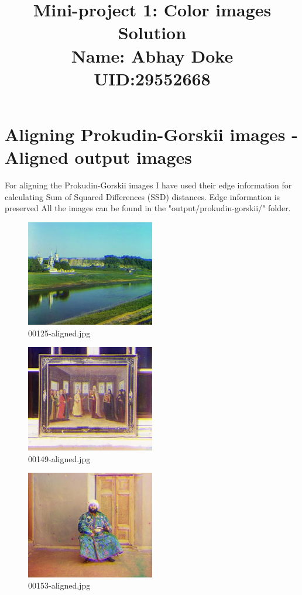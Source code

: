 \documentclass[10pt,letterpaper]{article}
\title{
  \textbf{Mini-project 1: Color images Solution} \\
  \textbf{Name: Abhay Doke}\\
  \textbf{UID:29552668}
}
\date{}
\begin{document}
\maketitle

\section{Aligning Prokudin-Gorskii images - Aligned output images} 
For aligning the Prokudin-Gorskii images I have used their edge information for calculating Sum of Squared Differences (SSD) distances.
Edge information is preserved  
All the images can be found in the "output/prokudin-gorskii/" folder.

\begin{figure}[h]
\centering
\includegraphics[width=0.5\textwidth]{output/prokudin-gorskii/00125-aligned.jpg}
\caption{00125-aligned.jpg}
\end{figure}

\begin{figure}[h]
\centering
\includegraphics[width=0.5\textwidth]{output/prokudin-gorskii/00149-aligned.jpg}
\caption{00149-aligned.jpg}
\end{figure}

\begin{figure}[h]
\centering
\includegraphics[width=0.5\textwidth]{output/prokudin-gorskii/00153-aligned.jpg}
\caption{00153-aligned.jpg}
\end{figure}
\end{document}

